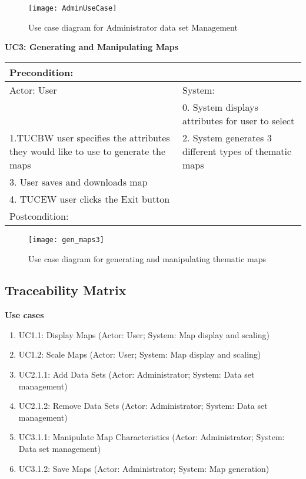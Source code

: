 \documentclass{article}
\begin{document}
{\begin{figure}[h!]
\texttt{[image: AdminUseCase]}
	\caption{Use case diagram for Administrator data set Management}
\end{figure}

\pagebreak
\noindent\textbf{UC3: Generating and Manipulating Maps}
\begin{flushleft}
\begin{tabular}{ |p{}|p{}| }
  \hline
  \multicolumn{2}{|p{\textwidth}|}{Precondition:} \\
  \hline
  Actor: User & System:  \\
   \hline
   & 0. System displays attributes for user to select \\
  \hline
    1.TUCBW user specifies the attributes they would like to use to generate the maps & 2. System generates 3 different types of thematic maps \\
  \hline
  3. User saves and downloads map  & \\
  \hline
  4. TUCEW user clicks the Exit button & \\
  \hline
  \multicolumn{2}{|p{\textwidth}|}{Postcondition:} \\
   \hline
\end{tabular}
\end{flushleft}

\begin{figure}[h!]
\texttt{[image: gen\_maps3]}
	\caption{Use case diagram for generating and manipulating thematic maps}
\end{figure} 

\pagebreak
\subsection{Traceability Matrix}
\textbf{Use cases}
\begin{enumerate}
\item UC1.1: Display Maps (Actor: User; System: Map display and scaling)
\item UC1.2: Scale Maps (Actor: User; System: Map display and scaling)
\item UC2.1.1: Add Data Sets (Actor: Administrator; System: Data set management)
\item UC2.1.2: Remove Data Sets (Actor: Administrator; System: Data set management)
\item UC3.1.1: Manipulate Map Characteristics (Actor: Administrator; System: Data set management)
\item UC3.1.2: Save Maps (Actor: Administrator; System: Map generation)


\end{enumerate}}
\end{document}
